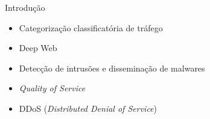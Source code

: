 \begin{frame}{Introdução}
 
    \begin{itemize}
      \item Categorização classificatória de tráfego \pause
      \item Deep Web \pause
      \item Detecção de intrusões e disseminação de malwares \pause
      \item \emph{Quality of Service} \pause
      \item DDoS (\emph{Distributed Denial of Service}) 
    \end{itemize}

\end{frame}